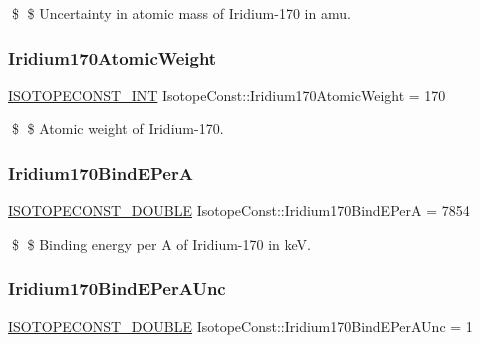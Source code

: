 \$ \$ Uncertainty in atomic mass of Iridium-\/170 in amu. \mbox{\label{group___isotope_const-_iridium-_ir170_ga3ab3841babbbe5c47fe95e4aa49158e9}} 
\subsubsection{\texorpdfstring{Iridium170\+Atomic\+Weight}{Iridium170AtomicWeight}}
{\footnotesize\ttfamily \mbox{\hyperlink{group___isotope_const-_macros_ga5f18360b3e99483a35c32d789e62621c}{I\+S\+O\+T\+O\+P\+E\+C\+O\+N\+S\+T\+\_\+\+I\+NT}} Isotope\+Const\+::\+Iridium170\+Atomic\+Weight = 170}

\$ \$ Atomic weight of Iridium-\/170. \mbox{\label{group___isotope_const-_iridium-_ir170_ga500d9f430cf2a46167fd0ba1a62add26}} 
\subsubsection{\texorpdfstring{Iridium170\+Bind\+E\+PerA}{Iridium170BindEPerA}}
{\footnotesize\ttfamily \mbox{\hyperlink{group___isotope_const-_macros_ga8f45a7272ce02c0b4c65c44636ed719a}{I\+S\+O\+T\+O\+P\+E\+C\+O\+N\+S\+T\+\_\+\+D\+O\+U\+B\+LE}} Isotope\+Const\+::\+Iridium170\+Bind\+E\+PerA = 7854}

\$ \$ Binding energy per A of Iridium-\/170 in keV. \mbox{\label{group___isotope_const-_iridium-_ir170_gaaf3266c680835b908613a79fdada6b5c}} 
\subsubsection{\texorpdfstring{Iridium170\+Bind\+E\+Per\+A\+Unc}{Iridium170BindEPerAUnc}}
{\footnotesize\ttfamily \mbox{\hyperlink{group___isotope_const-_macros_ga8f45a7272ce02c0b4c65c44636ed719a}{I\+S\+O\+T\+O\+P\+E\+C\+O\+N\+S\+T\+\_\+\+D\+O\+U\+B\+LE}} Isotope\+Const\+::\+Iridium170\+Bind\+E\+Per\+A\+Unc = 1}


